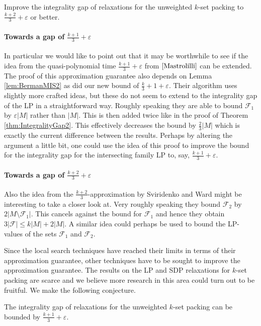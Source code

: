 \begin{prob}
Improve the integrality gap of relaxations for the unweighted $k$-set packing to $\frac{k+2}{3} + \varepsilon$ or better.
\end{prob}

\paragraph{Towards a gap of $\frac{k+1}{3} + \varepsilon$} In particular we would like to point out that it may be worthwhile to see if the idea from the quasi-polynomial time $\frac{k+1}{3} + \varepsilon$ from $\cite{Mastrolilli}$ can be extended. The proof of this approximation guarantee also depends on Lemma \ref{lem:BermanMIS2} as did our new bound of $\frac{k}{3} + 1 + \varepsilon$. Their algorithm uses slightly more crafted ideas, but these do not seem to extend to the integrality gap of the LP in a straightforward way. Roughly speaking they are able to bound $\mathcal{F}_1$ by $\varepsilon |M|$ rather than $|M|$. This is then added twice like in the proof of Theorem \ref{thm:IntegralityGap2}. This effectively decreases the bound by $\frac{2}{3}|M|$ which is exactly the current difference between the results. Perhaps by altering the argument a little bit, one could use the idea of this proof to improve the bound for the integrality gap for the intersecting family LP to, say, $\frac{k+1}{3} + \varepsilon$.

\paragraph{Towards a gap of $\frac{k+2}{3} + \varepsilon$} Also the idea from the $\frac{k+2}{3}$-approximation by Sviridenko and Ward \cite{Sviridenko} might be interesting to take a closer look at. Very roughly speaking they bound $\mathcal{F}_2$ by $2 |M \setminus \mathcal{F}_1|$. This cancels against the bound for $\mathcal{F}_1$ and hence they obtain $3 |\mathcal{F}| \leq k|M| + 2|M|$. A similar idea could perhaps be used to bound the LP-values of the sets $\mathcal{F}_1$ and $\mathcal{F}_2$.

Since the local search techniques have reached their limits in terms of their approximation guarantee, other techniques have to be sought to improve the approximation guarantee. The results on the LP and SDP relaxations for $k$-set packing are scarce and we believe more research in this area could turn out to be fruitful. We make the following conjecture.

\begin{conjecture}
The integrality gap of relaxations for the unweighted $k$-set packing can be bounded by $\frac{k+1}{3} + \varepsilon$.
\end{conjecture}

